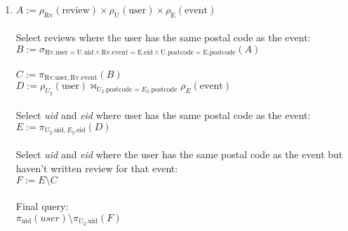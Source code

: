 \documentclass{article}
\newcommand{\GETS}{:=}
\newcommand{\rename}{\rho}
\newcommand{\select}{\sigma}
\newcommand{\rel}[1]{\text{#1}}
\newcommand{\attr}[1]{\text{#1}}
\newcommand{\ra}[2]{\rel{#1}.\attr{#2}}
\newcommand{\project}{\pi}
\newcommand{\product}{\times}
\newcommand{\difference}{\setminus}
\newcommand{\njoin}{\Join}
\begin{document}
\begin{enumerate}
  \item $A \GETS \rename_{\rel{Rv}}(\rel{review}) \product
                  \rename_{\rel{U}}(\rel{user}) \product
                  \rename_{\rel{E}}(\rel{event})$ \\ \\
        Select reviews where the user has the same postal code as the event:
        $B \GETS \select_{\ra{Rv}{user} = \ra{U}{uid} \land
                          \ra{Rv}{event} = \ra{E}{eid}\land
                          \ra{U}{postcode} = \ra{E}{postcode}}(A)$ \\ \\
        $C \GETS \project_{\ra{Rv}{user}, \ra{Rv}{event}}(B)$ \\
        $D \GETS \rename_{U_2}(\rel{user})
                  \njoin_{U_2.\attr{postcode} = E_2.\attr{postcode}}
                  \rename_{E}(\rel{event})$ \\ \\
        Select \emph{uid} and \emph{eid} where user has the same postal code as
        the event: \\
        $E \GETS \project_{U_2.\attr{uid}, E_2.\attr{eid}}(D)$ \\ \\
        Select \emph{uid} and \emph{eid} where the user has the same postal code
        as the event but haven't written review for that event: \\
        $F \GETS E \difference C$ \\ \\
        Final query: \\
        $\project_{\attr{uid}}(user) \difference \project_{U_2.\attr{uid}}(F)$
\end{enumerate}

\ \\
\end{document}
